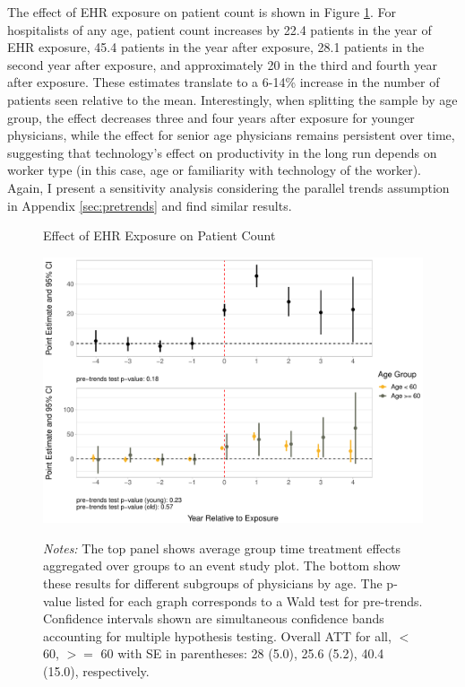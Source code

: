 \documentclass[12pt]{article}
\begin{document}
The effect of EHR exposure on patient count is shown in Figure \ref{fig:patient}. For hospitalists of any age, patient count increases by 22.4 patients in the year of EHR exposure, 45.4 patients in the year after exposure, 28.1 patients in the second year after exposure, and approximately 20 in the third and fourth year after exposure. These estimates translate to a 6-14\% increase in the number of patients seen relative to the mean. Interestingly, when splitting the sample by age group, the effect decreases three and four years after exposure for younger physicians, while the effect for senior age physicians remains persistent over time, suggesting that technology's effect on productivity in the long run depends on worker type (in this case, age or familiarity with technology of the worker). Again, I present a sensitivity analysis considering the parallel trends assumption in Appendix \ref{sec:pretrends} and find similar results. 

\begin{figure}[ht]
    \centering
    \captionsetup{width=.85\linewidth}
    \caption{Effect of EHR Exposure on Patient Count}
    \includegraphics[scale=.6]{Objects/patient_plot.pdf}
    \label{fig:patient}
    \vspace{2mm}
    \caption*{\footnotesize{\textit{Notes:} The top panel shows average group time treatment effects aggregated over groups to an event study plot. The bottom show these results for different subgroups of physicians by age. The p-value listed for each graph corresponds to a Wald test for pre-trends. Confidence intervals shown are simultaneous confidence bands accounting for multiple hypothesis testing. Overall ATT for all, $<$ 60, $>=$ 60 with SE in parentheses: 28 (5.0), 25.6 (5.2), 40.4 (15.0), respectively.}}
\end{figure}
\end{document}

